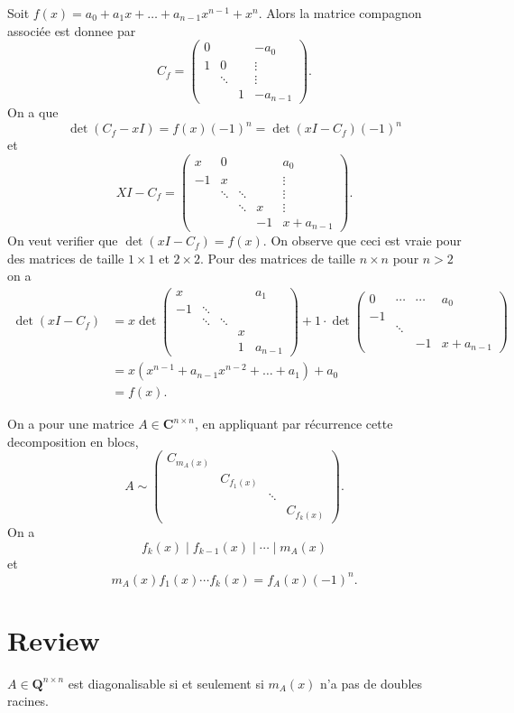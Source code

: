 Soit $f(x)=a_{0}+a_{1}x+\dots +a_{n-1}x^{n-1}+x^{n}$. Alors la matrice compagnon associée est donnee par 
$$
C_{f}=\begin{pmatrix}
0 &   &  & -a_{0} \\
1 & 0  &  & \vdots \\
 & \ddots &   &  \vdots\\
 &  & 1 & -a_{n-1} 
\end{pmatrix}.
$$
On a que
$$
\det(C_{f}-xI)=f(x)(-1)^{n}=\det(xI - C_{f})(-1)^{n}
$$
et
$$
XI -C_{f}=\begin{pmatrix}
x & 0  &  &  &a_{0} \\
-1 & x &  &  & \vdots  \\
 & \ddots & \ddots  &  & \vdots\\
   &  & \ddots  & x & \vdots\\
 &  &  &  -1 & x+a_{n-1}
\end{pmatrix}.
$$
On veut verifier que $\det(xI - C_{f})=f(x)$. On observe que ceci est vraie pour des matrices de taille $1\times 1$ et $2 \times 2$. Pour des matrices de taille $n\times n$ pour $n> 2$ on a
\begin{align*} 
\det(xI -C_{f}) & =x\det \begin{pmatrix}
x  &  &  &  & a_{1}\\
-1 & \ddots \\
 & \ddots & \ddots\\
 &  &  & x \\
 &  &  & 1 & a_{n-1}
\end{pmatrix}+1\cdot \det \begin{pmatrix}0  & \cdots &\cdots  & a_{0} \\
 -1 &  \\
   & \ddots  \\
   &  & -1 &x+a_{n-1} 
\end{pmatrix} \\
 & =x(x^{n-1}+a_{n-1}x^{n-2}+\dots +a_{1})+a_{0} \\
 & =f(x).
\end{align*}

On a pour une matrice $A\in \mathbf{C}^{n\times n}$, en appliquant par récurrence cette decomposition en blocs, 
$$
A \sim \begin{pmatrix}
C_{m_{A}(x)} \\
 & C_{f_{1}(x)}  \\
 &  & \ddots \\
 &  &  & C_{f_{k}(x)} 
\end{pmatrix}.
$$
On a 
$$
f_{k}(x)\mid f_{k-1}(x)\mid \cdots \mid m_{A}(x)
$$
et
$$
m_{A}(x)f_{1}(x)\cdots f_{k}(x)=f_{A}(x)(-1)^{n}.
$$


\section*{Review}
\begin{theorem}
$A\in \mathbf{Q}^{n\times n}$ est diagonalisable si et seulement si $m_{A}(x)$ n'a pas de doubles racines.  
\end{theorem}